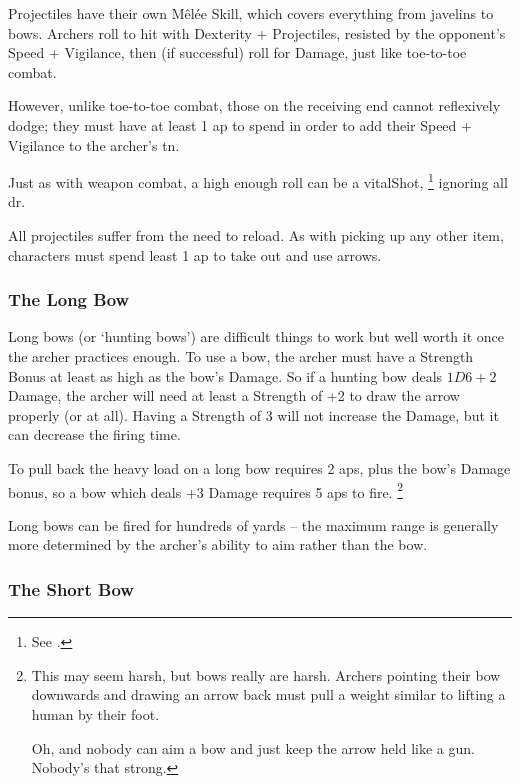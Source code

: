 \begin{multicols}{2}

\noindent
Projectiles have their own M\^el\'ee Skill, which covers everything from javelins to bows.
Archers roll to hit with Dexterity + Projectiles, resisted by the opponent's Speed + Vigilance, then (if successful) roll for Damage, just like toe-to-toe combat.



However, unlike toe-to-toe combat, those on the receiving end cannot reflexively dodge; they must have at least 1 \gls{ap} to spend in order to add their Speed + Vigilance to the archer's \gls{tn}.

Just as with weapon combat, a high enough roll can be a \gls{vitalShot},%
\footnote{See .}
ignoring all \gls{dr}.

All projectiles suffer from the need to reload.
As with picking up any other item, characters must spend least 1 \gls{ap} to take out and use arrows.

\subsubsection{The Long Bow}
\label{longbow}

Long bows (or `hunting bows') are difficult things to work but well worth it once the archer practices enough.
To use a bow, the archer must have a Strength Bonus at least as high as the bow's Damage.
So if a hunting bow deals $1D6+2$ Damage, the archer will need at least a Strength of +2 to draw the arrow properly (or at all).
Having a Strength of 3 will not increase the Damage, but it can decrease the firing time.

To pull back the heavy load on a long bow requires 2 \glspl{ap}, plus the bow's Damage bonus, so a bow which deals +3 Damage requires 5 \glspl{ap} to fire.%
\footnote{
  This may seem harsh, but bows really are harsh.  Archers pointing their bow downwards and drawing an arrow back must pull a weight similar to lifting a human by their foot.

  Oh, and nobody can aim a bow and just keep the arrow held like a gun.
  Nobody's that strong.
}

Long bows can be fired for hundreds of yards -- the maximum range is generally more determined by the archer's ability to aim rather than the bow.

\subsubsection{The Short Bow}


\end{multicols}

